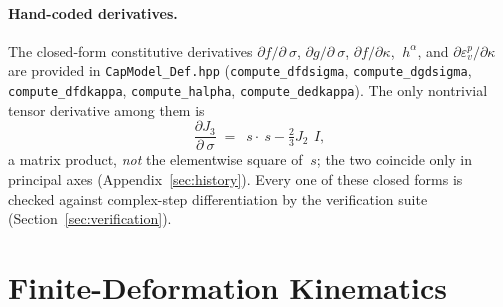 \documentclass[12pt]{article}
\newcommand{\stress}{~\sigma}
\newcommand{\ident}{~I}
\newcommand{\sdev}{~s}
\newcommand{\halpha}{~h^{\alpha}}
\begin{document}
\paragraph{Hand-coded derivatives.}
The closed-form constitutive derivatives
$\partial f/\partial \stress$, $\partial g/\partial \stress$,
$\partial f/\partial \kappa$, $\halpha$, and
$\partial\varepsilon_v^p/\partial\kappa$ are provided in
\texttt{CapModel\_Def.hpp} (\texttt{compute\_dfdsigma},
\texttt{compute\_dgdsigma}, \texttt{compute\_dfdkappa},
\texttt{compute\_halpha}, \texttt{compute\_dedkappa}). The only
nontrivial tensor derivative among them is
\begin{equation}
  \frac{\partial J_3}{\partial \stress}
  \;=\; \sdev\cdot\sdev - \tfrac{2}{3} J_2\,\ident ,
  \label{eq:dJ3}
\end{equation}
a matrix product, \emph{not} the elementwise square of $\sdev$; the
two coincide only in principal axes (Appendix~\ref{sec:history}).
Every one of these closed forms is checked against complex-step
differentiation by the verification suite
(Section~\ref{sec:verification}).

\section{Finite-Deformation Kinematics}
\label{sec:finite}
\end{document}
